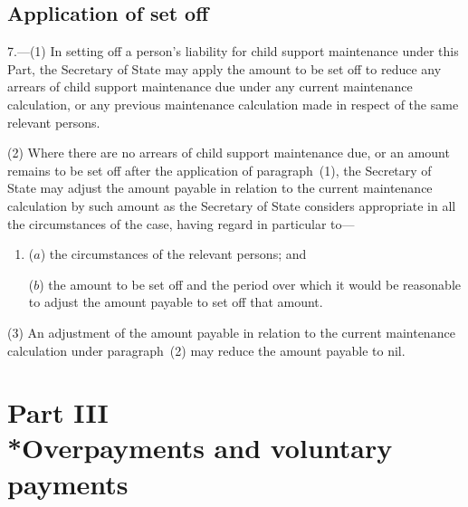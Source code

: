 \documentclass[12pt,a4paper]{article}
\begin{document}

\subsection[7. Application of set off]{Application of set off}

7.---(1)  In setting off a person’s liability for child support maintenance under this Part, the 
Secretary of State  %
may apply the amount to be set off to reduce any arrears of child support maintenance due under any current maintenance calculation, or any previous maintenance calculation made in respect of the same relevant persons.

(2) Where there are no arrears of child support maintenance due, or an amount remains to be set off after the application of paragraph~(1), the 
Secretary of State  %
may adjust the amount payable in relation to the current maintenance calculation by such amount as 
the Secretary of State  %
considers appropriate in all the circumstances of the case, having regard in particular to—
\begin{enumerate}\item[]
($a$) the circumstances of the relevant persons; and

($b$) the amount to be set off and the period over which it would be reasonable to adjust the amount payable to set off that amount.
\end{enumerate}

(3) An adjustment of the amount payable in relation to the current maintenance calculation under paragraph~(2) may reduce the amount payable to nil.


\section[Part III --- Overpayments and voluntary payments]{Part III\\*Overpayments and voluntary payments}
\end{document}
